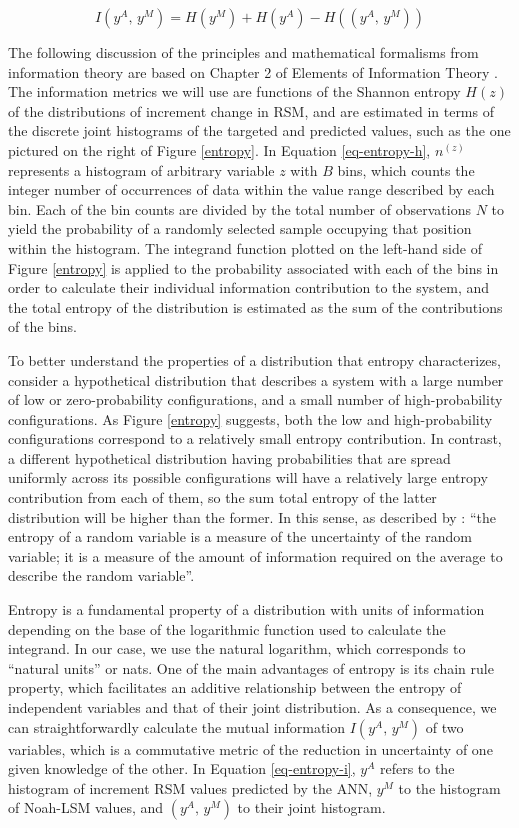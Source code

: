 \begin{equation}\label{eq-entropy-i}
    I(y^A,\,y^M) = H(y^M) + H(y^A) - H((y^A,\,y^M)) %
\end{equation}

The following discussion of the principles and mathematical formalisms from information theory are based on Chapter 2 of Elements of Information Theory \citep{schilling_entropy_2005}. The information metrics we will use are functions of the Shannon entropy $H(z)$ of the distributions of increment change in RSM, and are estimated in terms of the discrete joint histograms of the targeted and predicted values, such as the one pictured on the right of Figure \ref{entropy}. In Equation \ref{eq-entropy-h}, $n^{(z)}$ represents a histogram of arbitrary variable $z$ with $B$ bins, which counts the integer number of occurrences of data within the value range described by each bin. Each of the bin counts are divided by the total number of observations $N$ to yield the probability of a randomly selected sample occupying that position within the histogram. The integrand function plotted on the left-hand side of Figure \ref{entropy} is applied to the probability associated with each of the bins in order to calculate their individual information contribution to the system, and the total entropy of the distribution is estimated as the sum of the contributions of the bins.

To better understand the properties of a distribution that entropy characterizes, consider a hypothetical distribution that describes a system with a large number of low or zero-probability configurations, and a small number of high-probability configurations. As Figure \ref{entropy} suggests, both the low and high-probability configurations correspond to a relatively small entropy contribution. In contrast, a different hypothetical distribution having probabilities that are spread uniformly across its possible configurations will have a relatively large entropy contribution from each of them, so the sum total entropy of the latter distribution will be higher than the former. In this sense, as described by \citep{schilling_entropy_2005}: ``the entropy of a random variable is a measure of the uncertainty of the random variable; it is a measure of the amount of information required on the average to describe the random variable''.

Entropy is a fundamental property of a distribution with units of information depending on the base of the logarithmic function used to calculate the integrand. In our case, we use the natural logarithm, which corresponds to ``natural units'' or nats. One of the main advantages of entropy is its chain rule property, which facilitates an additive relationship between the entropy of independent variables and that of their joint distribution. As a consequence, we can straightforwardly calculate the mutual information $I(y^A,\,y^M)$ of two variables, which is a commutative metric of the reduction in uncertainty of one given knowledge of the other. In Equation \ref{eq-entropy-i}, $y^A$ refers to the histogram of increment RSM values predicted by the ANN, $y^M$ to the histogram of Noah-LSM values, and $(y^A,\,y^M)$ to their joint histogram.

